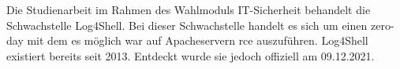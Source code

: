 
\textbf{}
\begin{flushleft}
Die Studienarbeit im Rahmen des Wahlmoduls IT-Sicherheit behandelt die Schwachstelle Log4Shell.
Bei dieser Schwachstelle handelt es sich um einen
zero-day mit dem es möglich war auf Apacheservern \gls{rce} auszuführen. Log4Shell existiert bereits seit 2013. Entdeckt
wurde sie jedoch offiziell am 09.12.2021.
\end{flushleft}

